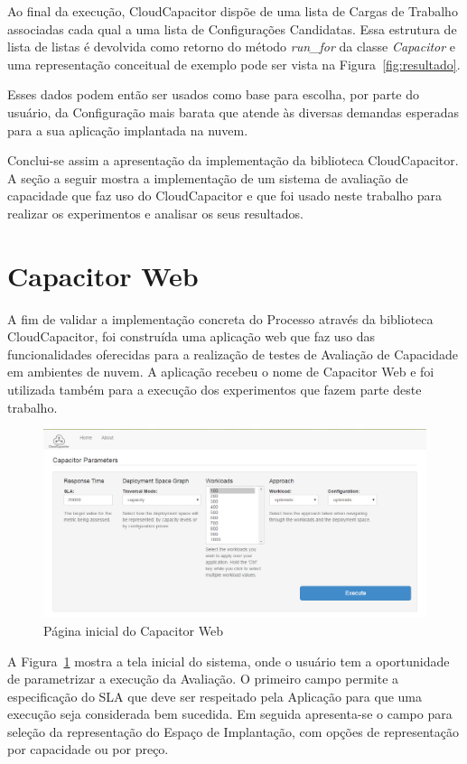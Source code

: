 Ao final da execução, CloudCapacitor dispõe de uma lista de Cargas de Trabalho 
associadas cada qual a uma lista de Configurações Candidatas. Essa estrutura de
lista de listas é devolvida como retorno do método \emph{run\_for} da classe 
\emph{Capacitor} e uma representação conceitual de exemplo pode ser vista na 
Figura~\ref{fig:resultado}. 

Esses dados podem então ser usados como base para escolha, por parte do usuário,
da Configuração mais barata que atende às diversas demandas esperadas para a 
sua aplicação implantada na nuvem.

Conclui-se assim a apresentação da implementação da biblioteca CloudCapacitor. A
seção a seguir mostra a implementação de um sistema de avaliação de capacidade 
que faz uso do CloudCapacitor e que foi usado neste trabalho para realizar os
experimentos e analisar os seus resultados.

\section{Capacitor Web}
A fim de validar a implementação concreta do Processo através da biblioteca
CloudCapacitor, foi construída uma aplicação web que faz uso das funcionalidades
oferecidas para a realização de testes de Avaliação de Capacidade em ambientes
de nuvem. A aplicação recebeu o nome de Capacitor Web e foi utilizada também
para a execução dos experimentos que fazem parte deste trabalho.

\begin{figure}[htb]
  \begin{center}
    \includegraphics[scale=0.5]{img/CapacitorWeb_Frontpage}
  \end{center}
  \caption{\label{fig:capacitor_web_front}Página inicial do Capacitor Web}
\end{figure}

A Figura~\ref{fig:capacitor_web_front} mostra a tela inicial do sistema, onde
o usuário tem a oportunidade de parametrizar a execução da Avaliação. O primeiro
campo permite a especificação do SLA que deve ser respeitado pela Aplicação para
que uma execução seja considerada bem sucedida. Em seguida apresenta-se o campo
para seleção da representação do Espaço de Implantação, com opções de representação
por capacidade ou por preço.

